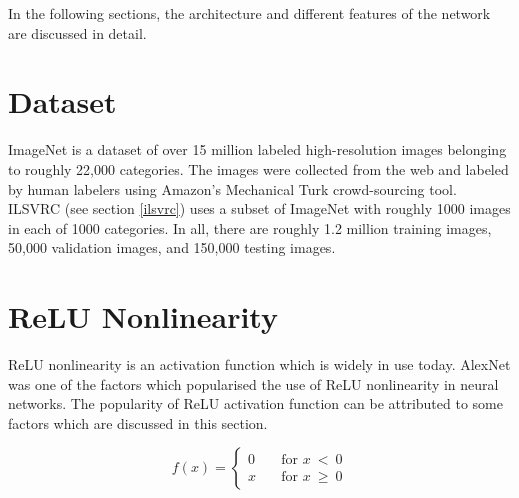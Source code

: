 \documentclass[11pt]{report}
\begin{document}
In the following sections, the architecture and different features of the network are discussed in detail.

\section{Dataset}
ImageNet is a dataset of over 15 million labeled high-resolution images belonging to roughly 22,000 categories. The images were collected from the web and labeled by human labelers using Amazon’s Mechanical Turk crowd-sourcing tool.  ILSVRC (see section \ref{ilsvrc}) uses a subset of ImageNet with roughly 1000 images in each of 1000 categories. In all, there are roughly 1.2 million training images, 50,000 validation images, and 150,000 testing images.

\section{ReLU Nonlinearity}
ReLU nonlinearity is an activation function which is widely in use today. AlexNet was one of the factors which popularised the use of ReLU nonlinearity in neural networks. The popularity of ReLU activation function can be attributed to some factors which are discussed in this section.

\begin{equation} \label{relueq}
	f(x) =
  				\begin{cases}
    			0       & \quad \text{for } x\ <\ 0\\
    			x  & \quad \text{for } x\ \geq\ 0
  				\end{cases}
\end{equation} 
  				
\end{document}
